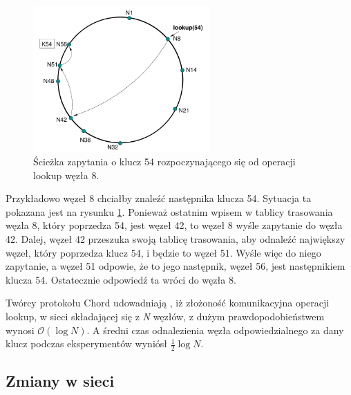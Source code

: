\documentclass[12pt, twoside, openany]{report}
\begin{document}




\begin{figure}[H]
\centering
\includegraphics[width=0.6\textwidth,height=\textheight,keepaspectratio]{lookup_example.png}
\caption{Ścieżka zapytania o klucz 54 rozpoczynającego się od operacji lookup węzła 8.}
\label{fig:lookup_example}
\end{figure}

Przykładowo węzeł 8 chciałby znaleźć następnika klucza 54. Sytuacja ta pokazana jest na rysunku \ref{fig:lookup_example}. Ponieważ ostatnim wpisem w tablicy trasowania węzła 8, który poprzedza 54, jest węzeł 42, to węzeł 8 wyśle zapytanie do węzła 42. Dalej, węzeł 42 przeszuka swoją tablicę trasowania, aby odnaleźć największy węzeł, który poprzedza klucz 54, i będzie to węzeł 51. Wyśle więc do niego zapytanie, a węzeł 51 odpowie, że to jego następnik, węzeł 56, jest następnikiem klucza 54. Ostatecznie odpowiedź ta wróci do węzła 8.

Twórcy protokołu Chord udowadniają \cite{bib:chord}, iż złożoność komunikacyjna operacji lookup, w sieci składającej się z \textit{N} węzłów, z dużym prawdopodobieństwem wynosi $\mathcal{O}(\log{}N)$. A średni czas odnalezienia węzła odpowiedzialnego za dany klucz podczas eksperymentów wyniósł $\frac{1}{2} \log{} N$.

\subsection{Zmiany w sieci}
\label{zmiany_w_sieci}
\end{document}
